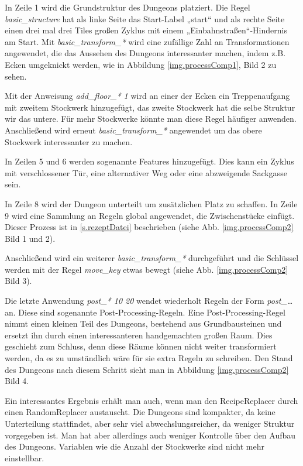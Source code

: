 
In Zeile 1 wird die Grundstruktur des Dungeons platziert. Die Regel \textit{basic\_structure} hat als linke Seite das Start-Label „start“ und als rechte Seite einen drei mal drei Tiles großen Zyklus mit einem „Einbahnstraßen“-Hindernis am Start. Mit \textit{basic\_transform\_*} wird eine zufällige Zahl an Transformationen angewendet, die das Aussehen des Dungeons interessanter machen, indem z.B. Ecken umgeknickt werden, wie in Abbildung \ref{img.processComp1}, Bild 2 zu sehen.

Mit der Anweisung \textit{add\_floor\_* 1} wird an einer der Ecken ein Treppenaufgang mit zweitem Stockwerk hinzugefügt, das zweite Stockwerk hat die selbe Struktur wir das untere. Für mehr Stockwerke könnte man diese Regel häufiger anwenden. Anschließend wird erneut \textit{basic\_transform\_*} angewendet um das obere Stockwerk interessanter zu machen.

In Zeilen 5 und 6 werden sogenannte Features hinzugefügt. Dies kann ein Zyklus mit verschlossener Tür, eine alternativer Weg oder eine abzweigende Sackgasse sein.


In Zeile 8 wird der Dungeon unterteilt um zusätzlichen Platz zu schaffen. In Zeile 9 wird eine Sammlung an Regeln global angewendet, die Zwischenstücke einfügt. Dieser Prozess ist in \ref{s.rezeptDatei} beschrieben (siehe Abb. \ref{img.processComp2} Bild 1 und 2).

Anschließend wird ein weiterer \textit{basic\_transform\_*} durchgeführt und die Schlüssel werden mit der Regel \textit{move\_key} etwas bewegt (siehe Abb. \ref{img.processComp2} Bild 3).

Die letzte Anwendung \textit{post\_* 10 20} wendet wiederholt Regeln der Form \textit{post\_\dots} an. Diese sind sogenannte Post-Processing-Regeln. Eine Post-Processing-Regel nimmt einen kleinen Teil des Dungeons, bestehend aus Grundbausteinen und ersetzt ihn durch einen interessanteren handgemachten großen Raum. Dies geschieht zum Schluss, denn diese Räume können nicht weiter transformiert werden, da es zu umständlich wäre für sie extra Regeln zu schreiben. Den Stand des Dungeons nach diesem Schritt sieht man in Abbildung \ref{img.processComp2} Bild 4.

Ein interessantes Ergebnis erhält man auch, wenn man den RecipeReplacer durch einen RandomReplacer austauscht. Die Dungeons sind kompakter, da keine Unterteilung stattfindet, aber sehr viel abwechslungsreicher, da weniger Struktur vorgegeben ist. Man hat aber allerdings auch weniger Kontrolle über den Aufbau des Dungeons. Variablen wie die Anzahl der Stockwerke sind nicht mehr einstellbar.


